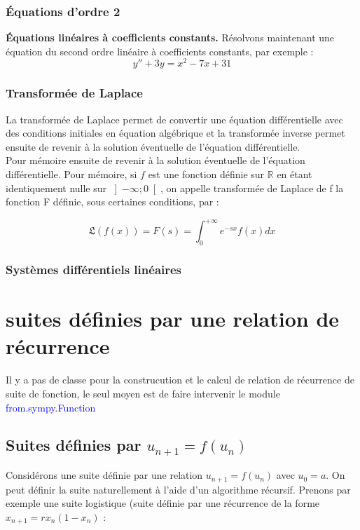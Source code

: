 \subsection{ Équations d’ordre 2}
\textbf{Équations linéaires à coefficients constants.} Résolvons maintenant une équation du second ordre linéaire à coefficients constants, par exemple :
\[
 y''+3y = x^{2}-7x+31
\]
\subsection{Transformée de Laplace}
La transformée de Laplace permet de convertir une équation différentielle avec
des conditions initiales en équation algébrique et la transformée inverse permet
ensuite de revenir à la solution éventuelle de l’équation différentielle.
\\
Pour mémoire ensuite de revenir à la solution éventuelle de l’équation différentielle.
Pour mémoire, si $f$ est une fonction définie sur $\mathbb{R}$ en étant identiquement nulle
sur $\left]-\infty; 0\right[$, on appelle transformée de Laplace de f la fonction F définie, sous
certaines conditions, par :

\[
 \mathfrak{L}\left(f\left(x\right)\right) = F\left(s\right) = \int_{0}^{+\infty} e^{-sx} f\left(x\right)dx
\]
\subsection{ Systèmes différentiels linéaires}
\chapter{suites définies par une relation de récurrence}
Il y a pas de classe pour la construcution et le calcul de relation de récurrence de suite de fonction, le seul moyen est
de faire intervenir le module \textcolor{blue}{from.sympy.Function}
	\section{Suites définies par $u_{n+1} = f\left(u_{n} \right)$}
 \begin{definition}
 Considérons une suite définie par une relation $u_{n+1} = f\left(u_{n}\right)$ avec $u_{0} = a$. On peut définir la suite naturellement à l’aide d’un algorithme récursif. Prenons par exemple une suite logistique (suite définie par une récurrence
de la forme $x_{n+1} = rx_{n}\left(1 - x_{n} \right)$ :
 \end{definition}
 
